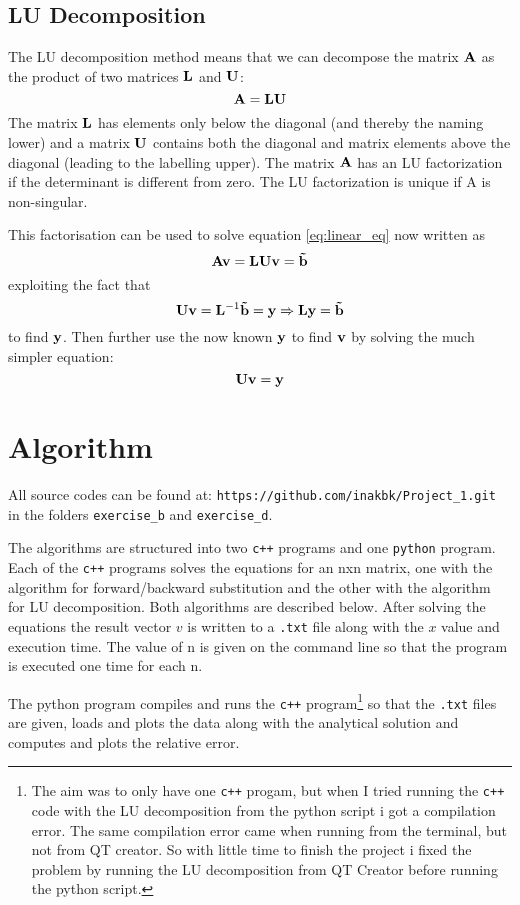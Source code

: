 \documentclass[11pt,a4wide]{article}
\begin{document}
\subsection{LU Decomposition}
The LU decomposition method means that we can decompose the matrix ${\bf A}$ as the product of two matrices ${\bf L}$ and ${\bf U}$:
\[
{\bf A} = {\bf L}{\bf U}
\]
 The matrix ${\bf L}$ has elements only below the diagonal (and thereby the naming lower) and a matrix ${\bf U}$ contains both the diagonal and matrix elements above the diagonal (leading to the labelling upper). The matrix ${\bf A}$ has an LU factorization if the determinant is different from zero. The LU factorization is unique if A is non-singular.
 
 This factorisation can be used to solve equation \ref{eq:linear_eq} now written as
\[
 {\bf A}{\bf v} = {\bf L}{\bf U}{\bf v} = {\bf \tilde{b}}
\]
exploiting the fact that
\[ 
{\bf U}{\bf v} = {\bf L}^{-1}{\bf \tilde{b}} = {\bf y} \Rightarrow {\bf L}{\bf y} = {\bf \tilde{b}}
\]
to find ${\bf y}$. Then further use the now known ${\bf y}$ to find ${\bf v}$ by solving the much simpler equation:
\[
{\bf U}{\bf v} = {\bf y}
\]


\section{Algorithm}
All source codes can be found at: \texttt{https://github.com/inakbk/Project\_1.git} in the folders \texttt{exercise\_b} and \texttt{exercise\_d}. 

The algorithms are structured into two \texttt{c++} programs and one \texttt{python} program. Each of the \texttt{c++} programs solves the equations for an nxn matrix, one with the algorithm for forward/backward substitution and the other with the algorithm for LU decomposition. Both algorithms are described below. After solving the equations the result vector $v$ is written to a \texttt{.txt} file along with the $x$ value and execution time. The value of n is given on the command line so that the program is executed one time for each n. 

The python program compiles and runs the \texttt{c++} program\footnote{The aim was to only have one \texttt{c++} progam, but when I tried running the \texttt{c++} code with the LU decomposition from the python script i got a compilation error. The same compilation error came when running from the terminal, but not from QT creator. So with little time to finish the project i fixed the problem by running the LU decomposition from QT Creator before running the python script. } so that the \texttt{.txt} files are given, loads and plots the data along with the analytical solution and computes and plots the relative error. 
\end{document}
